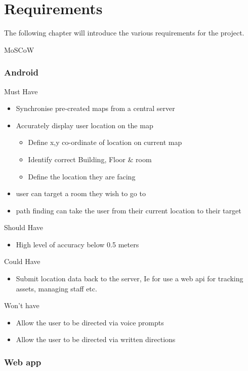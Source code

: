 \section{Requirements}
The following chapter will introduce the various requirements for the project.

MoSCoW

\subsubsection{Android}
Must Have
\begin{itemize}
	\item Synchronise pre-created maps from a central server
	\item Accurately display user location on the map
		\begin{itemize}
			\item Define x,y co-ordinate of location on current map
			\item Identify correct Building, Floor \& room
			\item Define the location they are facing
		\end{itemize}
	\item user can target a room they wish to go to
	\item path finding can take the user from their current location to their target
	
\end{itemize}
Should Have
\begin{itemize}
	\item High level of accuracy below 0.5 meters
\end{itemize}
Could Have
\begin{itemize}
	\item Submit location data back to the server, Ie for use a web api for tracking assets, managing staff etc.
	
\end{itemize}
Won't have
\begin{itemize}
	\item Allow the user to be directed via voice prompts
	\item Allow the user to be directed via written directions
\end{itemize}

\subsubsection{Web app}

